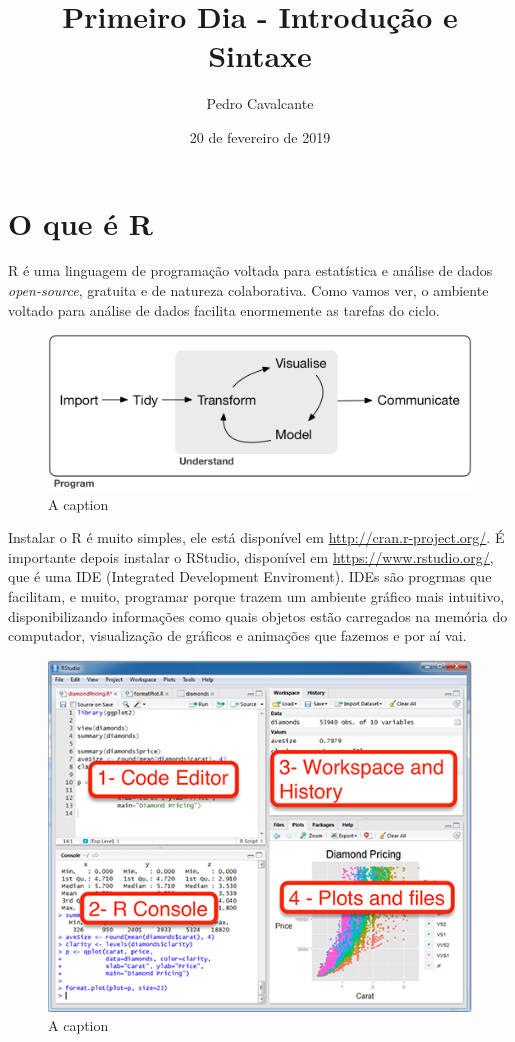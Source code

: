 \documentclass[
]{article}
\title{Primeiro Dia - Introdução e Sintaxe}
\author{Pedro Cavalcante}
\date{20 de fevereiro de 2019}
\begin{document}
\maketitle

\hypertarget{o-que-uxe9-r}{%
\section{O que é R}\label{o-que-uxe9-r}}

R é uma linguagem de programação voltada para estatística e análise de
dados \emph{open-source}, gratuita e de natureza colaborativa. Como
vamos ver, o ambiente voltado para análise de dados facilita enormemente
as tarefas do ciclo.

\begin{figure}
\includegraphics[width=1\linewidth]{data-science} \caption{A caption}\label{fig:unnamed-chunk-1}
\end{figure}

Instalar o R é muito simples, ele está disponível em
\url{http://cran.r-project.org/}. É importante depois instalar o
RStudio, disponível em \url{https://www.rstudio.org/}, que é uma IDE
(Integrated Development Enviroment). IDEs são progrmas que facilitam, e
muito, programar porque trazem um ambiente gráfico mais intuitivo,
disponibilizando informações como quais objetos estão carregados na
memória do computador, visualização de gráficos e animações que fazemos
e por aí vai.

\begin{figure}
\includegraphics[width=1\linewidth]{rstudio} \caption{A caption}\label{fig:pressure}
\end{figure}
\end{document}
